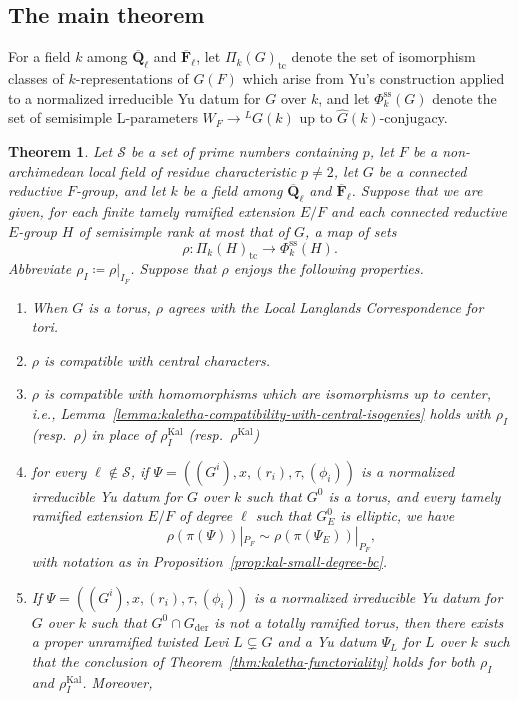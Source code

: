 \documentclass[reqno]{amsart}
\numberwithin{equation}{subsection}
\newcommand{\F}{\mathbf{F}}
\newcommand{\Q}{\mathbf{Q}}
\newcommand{\ol}[1]{\overline{#1}}
\newcommand{\wh}[1]{\widehat{#1}}
\newcommand{\co}{\colon}
\newcommand{\ld}{{}^L}
\newcommand\cS{\mathcal{S}}
\DeclareMathOperator{\Kal}{Kal}
\DeclareMathOperator{\der}{der}
\renewcommand{\ss}{\mathrm{ss}}
\newtheorem{thm}{Theorem}[subsection]
\theoremstyle{remark}
\numberwithin{equation}{subsection}
\numberwithin{figure}{subsection}
\begin{document}
\subsection{The main theorem}

For a field $k$ among $\ol\Q_\ell$ and $\ol\F_\ell$, let $\Pi_k(G)_{\mathrm{tc}}$ denote the set of isomorphism classes of $k$-representations of $G(F)$ which arise from Yu's construction applied to a normalized irreducible Yu datum for $G$ over $k$, and let $\Phi_k^{\ss}(G)$ denote the set of semisimple L-parameters $W_F \to \ld G(k)$ up to $\wh G(k)$-conjugacy.  

\begin{thm}\label{thm:llc-partial-characterization}
Let $\cS$ be a set of prime numbers containing $p$, let $F$ be a non-archimedean local field of residue characteristic $p \neq 2$, let $G$ be a connected reductive $F$-group, and let $k$ be a field among $\ol\Q_\ell$ and $\ol\F_\ell$. Suppose that we are given, for each finite tamely ramified extension $E/F$ and each connected reductive $E$-group $H$ of semisimple rank at most that of $G$, a map of sets
\[
\rho\co \Pi_k(H)_{\mathrm{tc}} \to \Phi_k^{\ss}(H).
\]
Abbreviate $\rho_I \coloneqq \rho|_{I_F}$. Suppose that $\rho$ enjoys the following properties. 
\begin{enumerate}
    \item When $G$ is a torus, $\rho$ agrees with the Local Langlands Correspondence for tori.
    \item $\rho$ is compatible with central characters.
    \item $\rho$ is compatible with homomorphisms which are isomorphisms up to center, i.e., Lemma~\ref{lemma:kaletha-compatibility-with-central-isogenies} holds with $\rho_I$ (resp.\ $\rho$) in place of $\rho_I^{\Kal}$ (resp.\ $\rho^{\Kal}$)
    \item for every $\ell\notin\cS$, if $\Psi = ((G^i), x, (r_i), \tau, (\phi_i))$ is a normalized irreducible Yu datum for $G$ over $k$ such that $G^0$ is a torus, and every tamely ramified extension $E/F$ of degree $\ell$ such that $G^0_E$ is elliptic, we have
    \[
    \rho(\pi(\Psi))|_{P_F}
    \sim
    \rho(\pi(\Psi_E))|_{P_F},
    \]
    with notation as in Proposition~\ref{prop:kal-small-degree-bc}.
    \item If $\Psi = ((G^i), x, (r_i), \tau, (\phi_i))$ is a normalized irreducible Yu datum for $G$ over $k$ such that $G^0 \cap G_{\der}$ is not a totally ramified torus, then there exists a proper unramified twisted Levi $L \subsetneq G$ and a Yu datum $\Psi_L$ for $L$ over $k$ such that the conclusion of Theorem~\ref{thm:kaletha-functoriality} holds for both $\rho_I$ and $\rho_I^{\Kal}$. Moreover,

\end{enumerate}
\end{thm}
\end{document}
